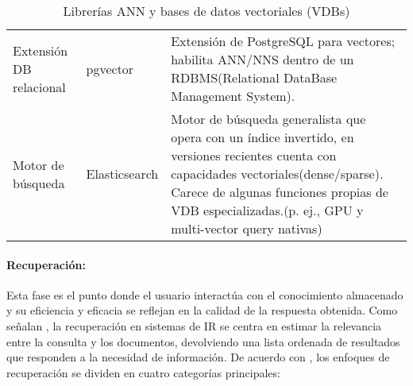 \begin{table}[H]
\begin{tabular}{p{2.6cm} p{3.2cm} p{9.8cm}}
Extensión DB relacional & pgvector & Extensión de PostgreSQL para vectores; habilita ANN/NNS dentro de un RDBMS(Relational DataBase Management System).\\
Motor de búsqueda & Elasticsearch & Motor de búsqueda generalista que opera con un índice invertido, en versiones recientes cuenta con capacidades vectoriales(dense/sparse). Carece de algunas funciones propias de VDB especializadas.(p. ej., GPU y multi-vector query nativas) \\
\bottomrule
\end{tabular}
\caption{Librerías ANN y bases de datos vectoriales (VDBs)}
\label{tab:vdb_ann_corpus}
\end{table}


\paragraph{Recuperación:} Esta fase es el punto donde el usuario interactúa con el conocimiento almacenado y su eficiencia y eficacia se reflejan en la calidad 
de la respuesta obtenida. Como señalan \textcite{fan2021pretraining}, la recuperación en sistemas de IR se centra en estimar la relevancia entre la consulta y los documentos, devolviendo una lista ordenada
de resultados que responden a la necesidad de información.  
De acuerdo con \textcite{hambarde2023ir}, los enfoques de recuperación se dividen en cuatro categorías principales:

